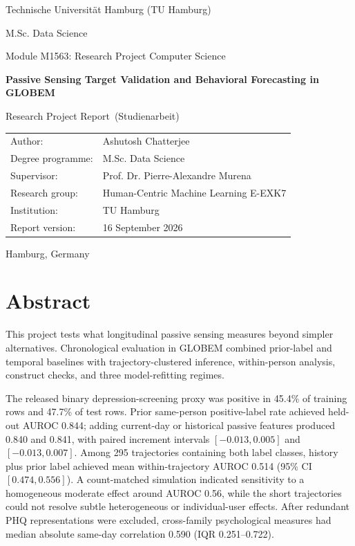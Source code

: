 \documentclass[a4paper,11pt,oneside]{report}
\newcommand{\reporttitle}{Passive Sensing Target Validation and Behavioral Forecasting in GLOBEM}
\newcommand{\reportsubtitle}{Research Project Report}
\newcommand{\reportauthor}{Ashutosh Chatterjee}
\newcommand{\reportdate}{16 September 2026}
\begin{document}
\hypersetup{pageanchor=false}
\begin{titlepage}
  \centering
  {\Large Technische Universit\"at Hamburg (TU Hamburg)\par}
  \vspace{0.6cm}
  {\large M.Sc. Data Science\par}
  {\large Module M1563: Research Project Computer Science\par}
  \vspace{2.2cm}
  {\Huge\bfseries \reporttitle\par}
  \vspace{0.7cm}
  {\Large \reportsubtitle\ (Studienarbeit)\par}
  \vfill
  \begin{tabular}{@{}ll@{}}
    Author: & \reportauthor \\
    Degree programme: & M.Sc. Data Science \\
    Supervisor: & Prof. Dr. Pierre-Alexandre Murena \\
    Research group: & Human-Centric Machine Learning E-EXK7 \\
    Institution: & TU Hamburg \\
    Report version: & \reportdate \\
  \end{tabular}
  \vfill
  {\small Hamburg, Germany\par}
\end{titlepage}
\hypersetup{pageanchor=true}

\setcounter{page}{1}

\chapter*{Abstract}

This project tests what longitudinal passive sensing measures beyond simpler
alternatives. Chronological evaluation in GLOBEM combined prior-label and temporal
baselines with trajectory-clustered inference, within-person analysis, construct
checks, and three model-refitting regimes.

The released binary depression-screening proxy was positive in 45.4\% of training
rows and 47.7\% of test rows. Prior same-person positive-label rate achieved held-out
AUROC 0.844; adding current-day or historical passive features produced 0.840 and 0.841, with paired
increment intervals $[-0.013,0.005]$ and $[-0.013,0.007]$. Among 295 trajectories
containing both label classes, history plus prior label achieved mean
within-trajectory AUROC 0.514 (95\% CI $[0.474,0.556]$). A count-matched simulation
indicated sensitivity to a homogeneous moderate effect around AUROC 0.56, while the
short trajectories could not resolve subtle heterogeneous or individual-user
effects. After redundant PHQ representations were excluded, cross-family
psychological measures had median absolute same-day correlation 0.590 (IQR
0.251--0.722).
\end{document}
